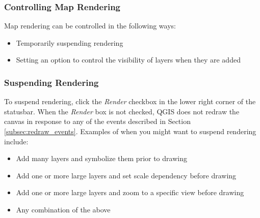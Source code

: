 \subsubsection{Controlling Map Rendering}\label{label_controlmap}

Map rendering can be controlled in the following ways:

\begin{itemize}
\item Temporarily suspending rendering
\item Setting an option to control the visibility of layers when they are
added
\end{itemize}

%
%
%
\subsubsection{Suspending Rendering}
\label{label_suspendrender}

To suspend rendering, click the \textit{Render} checkbox in the lower right
corner of the statusbar. When the \textit{Render} box is not checked, QGIS
does not redraw the canvas in response to any of the events described in
Section \ref{subsec:redraw_events}. Examples of when you might want to suspend
rendering include:

\begin{itemize}
\item Add many layers and symbolize them prior to drawing
\item Add one or more large layers and set scale dependency before drawing
\item Add one or more large layers and zoom to a specific view before
drawing
\item Any combination of the above
\end{itemize}

